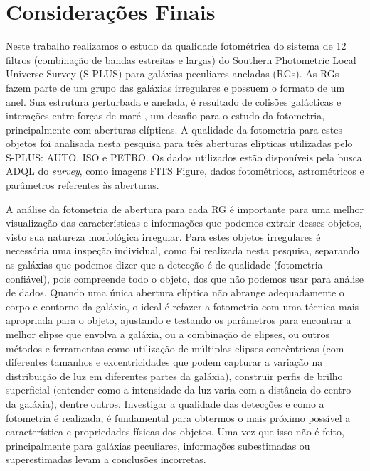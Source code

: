 \chapter{Considerações Finais}

Neste trabalho realizamos o estudo da qualidade fotométrica do sistema de 12 filtros (combinação de
bandas estreitas e largas) do Southern Photometric Local Universe Survey (S-PLUS) para galáxias peculiares aneladas (RGs). As RGs fazem parte de um grupo das galáxias irregulares e possuem o formato de um anel. Sua estrutura perturbada e anelada, é resultado de colisões galácticas e interações entre forças de maré \cite{2010arnab}, um desafio para o estudo da fotometria, principalmente com aberturas elípticas. A qualidade da fotometria para estes objetos foi analisada nesta pesquisa para três aberturas elípticas utilizadas pelo S-PLUS: AUTO, ISO e PETRO. Os dados utilizados estão disponíveis pela busca ADQL do \emph{survey}, como imagens FITS Figure, dados fotométricos, astrométricos e parâmetros referentes às aberturas.

A análise da fotometria de abertura para cada RG é importante para uma melhor visualização das características e informações que podemos extrair desses objetos, visto sua natureza morfológica irregular. Para estes objetos irregulares é necessária uma inspeção individual, como foi realizada nesta pesquisa, separando as galáxias que podemos dizer que a detecção é de qualidade (fotometria confiável), pois compreende todo o objeto, dos que não podemos usar para análise de dados. Quando uma única abertura elíptica não abrange adequadamente o corpo e contorno da galáxia, o ideal é refazer a fotometria com uma técnica mais apropriada para o objeto, ajustando e testando os parâmetros para encontrar a melhor elipse que envolva a galáxia, ou a combinação de elipses, ou outros métodos e ferramentas como utilização de múltiplas elipses concêntricas (com diferentes tamanhos e excentricidades que podem capturar a variação na distribuição de luz em diferentes partes da galáxia), construir perfis de brilho superficial (entender como a intensidade da luz varia com a distância do centro da galáxia), dentre outros. Investigar a qualidade das detecções e como a fotometria é realizada, é fundamental para obtermos o mais próximo possível a característica e propriedades físicas dos objetos. Uma vez que isso não é feito, principalmente para galáxias peculiares, informações subestimadas ou superestimadas levam a conclusões incorretas.

